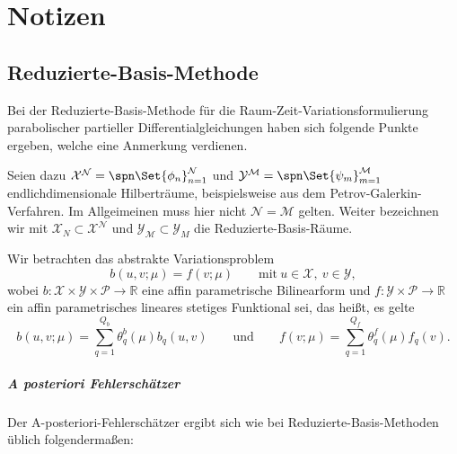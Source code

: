 
\chapter{Notizen} %
\label{cha:notizen}


\section{Reduzierte-Basis-Methode} %
\label{sec:reduzierte_basis_methode}

Bei der Reduzierte-Basis-Methode für die Raum-Zeit-Variationsformulierung parabolischer partieller Differentialgleichungen haben sich folgende Punkte ergeben, welche eine Anmerkung verdienen.

Seien dazu $\mathcal X^{\mathcal N} = \spn\Set{\phi_{n}}_{n=1}^{\mathcal N}$ und $\mathcal Y^{\mathcal M} = \spn\Set{\psi_{m}}_{m = 1}^{\mathcal M}$ endlichdimensionale Hilberträume, beispielsweise aus dem Petrov-Galerkin-Verfahren.
Im Allgeimeinen muss hier nicht $\mathcal N = \mathcal M$ gelten.
Weiter bezeichnen wir mit $\mathcal X_{N} \subset \mathcal X^{\mathcal N}$ und $\mathcal Y_{\mathcal M} \subset \mathcal Y_{M}$ die Reduzierte-Basis-Räume.

Wir betrachten das abstrakte Variationsproblem
\begin{equation}
    b(u, v; \mu) = f(v; \mu) \qquad \text{mit}~u \in \mathcal X,~v \in \mathcal Y,
\end{equation}
wobei $b \colon \mathcal X \times \mathcal Y \times \mathcal P \to \mathbb{R}$ eine affin parametrische Bilinearform und $f \colon \mathcal Y \times \mathcal P \to \mathbb{R}$ ein affin parametrisches lineares stetiges Funktional sei,
das heißt, es gelte
\begin{equation}
    b(u, v; \mu) = \sum_{q = 1}^{Q_b} \theta^{b}_{q}(\mu) b_{q}(u, v)
    \qquad \text{und} \qquad
    f(v; \mu) = \sum_{q = 1}^{Q_f} \theta^{f}_{q}(\mu) f_{q}(v).
\end{equation}

\paragraph{A posteriori Fehlerschätzer} %
\label{par:a_posteriori_fehlersch_tzer}

Der A-posteriori-Fehlerschätzer ergibt sich wie bei Reduzierte-Basis-Methoden üblich folgendermaßen:

